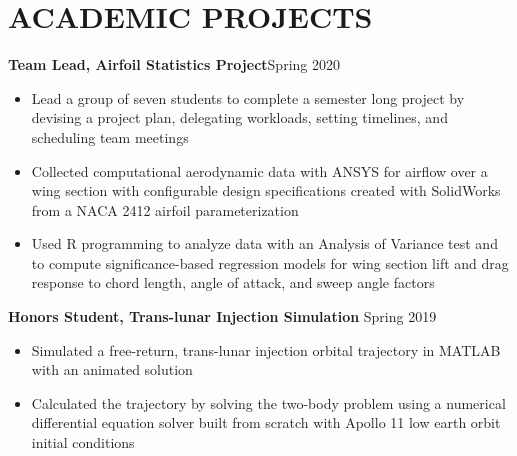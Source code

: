\documentclass{article}
\begin{document}
\section{ACADEMIC PROJECTS}

\textbf{Team Lead, Airfoil Statistics Project}\hfill Spring 2020
\vspace{0.5em}
\begin{itemize}
	\item Lead a group of seven students to complete a semester long project by devising a project plan, delegating workloads, setting timelines, and scheduling team meetings
	\item Collected computational aerodynamic data with ANSYS for airflow over a wing section with configurable design specifications created with SolidWorks from a NACA 2412 airfoil parameterization
	\item Used R programming to analyze data with an Analysis of Variance test and to compute significance-based regression models for wing section lift and drag response to chord length, angle of attack, and sweep angle factors
\end{itemize}
\vspace{0.5em}
\textbf{Honors Student, Trans-lunar Injection Simulation} 
\hfill
Spring 2019
\vspace{0.5em}
\begin{itemize}
	\item Simulated a free-return, trans-lunar injection orbital trajectory in MATLAB with an animated solution
	\item Calculated the trajectory by solving the two-body problem using a numerical differential equation solver built from scratch with Apollo 11 low earth orbit initial conditions
\end{itemize}

\thispagestyle{empty}
\end{document}
